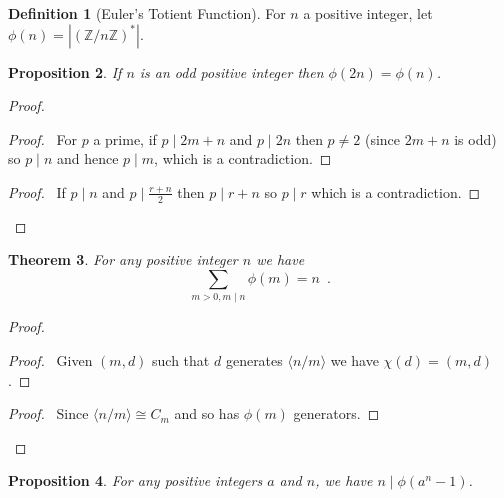 \documentclass{book}
\let\qed\relax
\newtheorem{prop}{Proposition}[chapter]
\newtheorem{thm}[prop]{Theorem}
\theoremstyle{definition}
\newtheorem{df}[prop]{Definition}
\begin{document}
\begin{df}[Euler's Totient Function]
    For $n$ a positive integer, let $\phi(n) = |(\mathbb{Z} / n \mathbb{Z})^*|$.
\end{df}

\begin{prop}
    If $n$ is an odd positive integer then $\phi(2n) = \phi(n)$.
\end{prop}

\begin{proof}
    \pf
    \begin{proof}
        \pf\ For $p$ a prime, if $p \mid 2m+n$ and $p \mid 2n$ then $p \neq 2$ (since $2m+n$ is odd) so $p \mid n$ and hence $p \mid m$, which is a contradiction.
    \end{proof}
    \begin{proof}
        \pf\ If $p \mid n$ and $p \mid \frac{r + n}{2}$ then $p \mid r + n$ so $p \mid r$ which is a contradiction.
    \end{proof}
    \qed
\end{proof}

\begin{thm}
For any positive integer $n$ we have
\[ \sum_{m > 0, m \mid n} \phi(m) = n \enspace . \]
\end{thm}

\begin{proof}
\pf
{}
\begin{proof}
\pf\ Given $(m,d)$ such that $d$ generates $\langle n/m \rangle$ we have $\chi(d) = (m,d)$.
\end{proof}
\begin{proof}
\pf\ Since $\langle n/m \rangle \cong C_m$ and so has $\phi(m)$ generators.
\end{proof}
\qed
\end{proof}

\begin{prop}
For any positive integers $a$ and $n$, we have $n \mid \phi(a^n - 1)$.
\end{prop}
\end{document}
